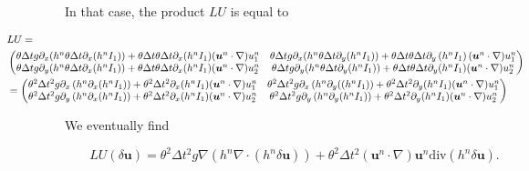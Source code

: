 \documentclass[a4paper, 11pt]{article}
\begin{document}
In that case, the product $LU$ is equal to
\begin{tiny}
\begin{equation*}
\begin{split}
&\hspace*{-2cm}LU=\\
&\hspace*{-2cm}\begin{pmatrix}
\theta\Delta tg\partial_x(h^n\theta\Delta t\partial_x(h^nI_1))+\theta\Delta t\theta\Delta t\partial_x(h^nI_1)(\boldsymbol{u}^n\cdot\nabla)u_1^n&\theta\Delta tg\partial_x(h^n\theta\Delta t\partial_y(h^nI_1))+\theta\Delta t\theta\Delta t\partial_y\left(h^nI_1\right)(\boldsymbol{u}^n\cdot\nabla)u_1^n\\
\theta\Delta tg\partial_y(h^n\theta\Delta t\partial_x(h^nI_1))+\theta\Delta t\theta\Delta t\partial_x(h^nI_1)(\boldsymbol{u}^n\cdot\nabla)u_2^n&\theta\Delta tg\partial_y(h^n\theta\Delta t\partial_y(h^nI_1))+\theta\Delta t\theta\Delta t\partial_y(h^nI_1)(\boldsymbol{u}^n\cdot\nabla)u_2^n
\end{pmatrix}\\
&\hspace*{-2cm}=\begin{pmatrix}\theta^2\Delta t^2g\partial_x\left(h^n\partial_x(h^nI_1)\right)+\theta^2\Delta t^2\partial_x(h^nI_1)(\boldsymbol{u}^n\cdot\nabla)u_1^n&\theta^2\Delta t^2g\partial_{x}\left(h^n\partial_y((h^nI_1)\right)+\theta^2\Delta t^2\partial_y(h^nI_1)(\boldsymbol{u}^n\cdot\nabla)u_1^n\\
\theta^2\Delta t^2g\partial_y\left(h^n\partial_x(h^nI_1)\right)+\theta^2\Delta t^2\partial_x(h^nI_1)(\boldsymbol{u}^n\cdot \nabla)u_2^n&\theta^2\Delta t^2g\partial_{y}\left(h^n\partial_y(h^nI_1)\right)+\theta^2\Delta t^2\partial_y(h^nI_1)(\boldsymbol{u}^n\cdot\nabla)u_2^n\end{pmatrix}
\end{split}
\end{equation*}
\end{tiny}
We eventually find

\begin{equation*}
LU(\delta \boldsymbol{u})=\theta^2\Delta t^2g\nabla\left(h^n\nabla\cdot\left(h^n\delta\boldsymbol{u}\right)\right)+\theta^2\Delta t^2\left(\boldsymbol{u}^n\cdot\nabla\right)\boldsymbol{u}^n\text{div}(h^n\delta \boldsymbol{u}).
\end{equation*}
\end{document}
